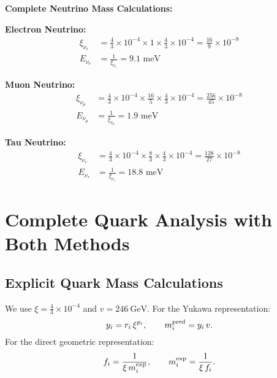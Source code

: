 \documentclass[12pt,a4paper]{article}
\begin{document}
	\textbf{Complete Neutrino Mass Calculations:}
	
	\textbf{Electron Neutrino:}
	\begin{align}
		\xi_{\nu_e} &= \frac{4}{3} \times 10^{-4} \times 1 \times \frac{4}{3} \times 10^{-4} = \frac{16}{9} \times 10^{-8} \\
		E_{\nu_e} &= \frac{1}{\xi_{\nu_e}} = 9.1 \text{ meV}
	\end{align}
	
	\textbf{Muon Neutrino:}
	\begin{align}
		\xi_{\nu_\mu} &= \frac{4}{3} \times 10^{-4} \times \frac{16}{5} \times \frac{4}{3} \times 10^{-4} = \frac{256}{45} \times 10^{-8} \\
		E_{\nu_\mu} &= \frac{1}{\xi_{\nu_\mu}} = 1.9 \text{ meV}
	\end{align}
	
	\textbf{Tau Neutrino:}
	\begin{align}
		\xi_{\nu_\tau} &= \frac{4}{3} \times 10^{-4} \times \frac{8}{3} \times \frac{4}{3} \times 10^{-4} = \frac{128}{27} \times 10^{-8} \\
		E_{\nu_\tau} &= \frac{1}{\xi_{\nu_\tau}} = 18.8 \text{ meV}
	\end{align}
	
	\section{Complete Quark Analysis with Both Methods}
	\label{sec:quark_analysis}
	
	\subsection{Explicit Quark Mass Calculations}
	\label{subsec:quark_calculations}
	
	We use $\xi=\tfrac{4}{3}\times10^{-4}$ and $v=246\ \mathrm{GeV}$.
	For the Yukawa representation:
	\[
	y_i = r_i\,\xi^{p_i},\qquad m_i^{\rm pred}=y_i\,v.
	\]
	For the direct geometric representation:
	\[
	f_i=\frac{1}{\xi\, m_i^{\rm exp}},\qquad m_i^{\rm exp}=\frac{1}{\xi\, f_i}.
	\]
	
\end{document}
